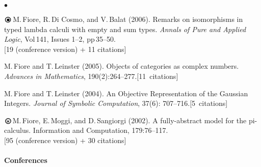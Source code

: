 \documentclass[11pt,twocolumn]{article}
\newenvironment{mybigitemize}
  {\begin{list}{$\bullet$}
  {\setlength{\topsep}{2pt}
   \setlength{\partopsep}{2pt}
   \setlength{\itemsep}{2.5pt}
   \setlength{\parsep}{2.5pt}
   \setlength{\leftmargin}{1em}
   \setlength{\labelwidth}{.5em}}}
  {\end{list}}
\newcommand{\obullet}{\mbox{$\raisebox{-.85mm}{\huge$\circ$}\hspace*{-2.6mm}\bullet$}}
\renewcommand{\ostar}{\mbox{$\raisebox{-.85mm}{\huge$\circ$}\hspace*{-2.75mm}\star$}}
\begin{document}
\begin{mybigitemize}
\item[$\obullet$]
  M.\,Fiore, R.\,Di Cosmo, and V.\,Balat (2006).  Remarks on
  isomorphisms in typed lambda calculi with empty and sum types. 
  \emph{Annals of Pure and Applied Logic}, Vol\,141, Issues 1--2,
  pp\,35--50.\\\mbox{}\hfill{\small[19 (conference version) + 11 citations]}


\item
  M.\,Fiore and T.\,Leinster (2005).  Objects of categories as
  complex numbers.  \emph{Advances in Mathematics},
  190(2):264--277.\mbox{}\hfill{\small[11~citations]} 

\item
  M.\,Fiore and T.\,Leinster (2004).  An Objective Representation of
  the Gaussian Integers.  \emph{Journal of Symbolic Computation},
  37(6): 707--716.\mbox{}\hfill{\small[5~citations]} 

\item[$\ostar$]
  M.\,Fiore, E.\,Moggi, and D.\,Sangiorgi (2002).  A fully-abstract
  model for the pi-calculus.  Information and Computation,
  179:76--117.\\\mbox{}\hfill{\small[95 (conference version) + 30 citations]}
\end{mybigitemize}

\paragraph*{Conferences}
\end{document}
